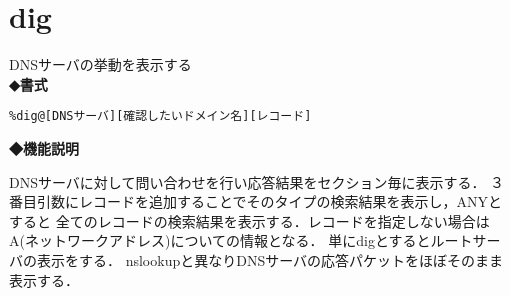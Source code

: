 \section{dig}
DNSサーバの挙動を表示する\\
\label{cmd:dig}
\noindent
{\bf ◆書式}
\begin{center}
\begin{screen}
\begin{alltt}
\% dig  @[DNSサーバ] [確認したいドメイン名] [レコード]
\end{alltt}
\end{screen}
\end{center}

\noindent
{\bf ◆機能説明}

DNSサーバに対して問い合わせを行い応答結果をセクション毎に表示する．
３番目引数にレコードを追加することでそのタイプの検索結果を表示し，ANYとすると
全てのレコードの検索結果を表示する．レコードを指定しない場合はA(ネットワークアドレス)についての情報となる．
単にdigとするとルートサーバの表示をする．
nslookupと異なりDNSサーバの応答パケットをほぼそのまま表示する．

